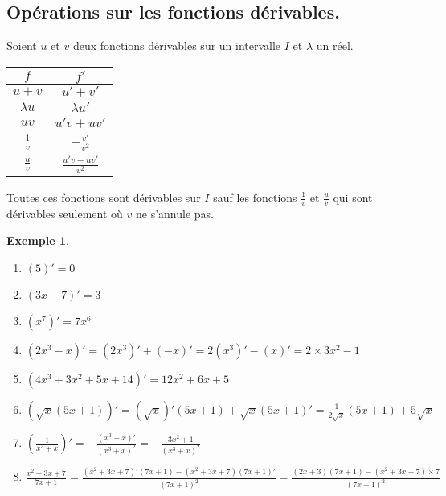 \documentclass[a4paper,11pt]{article}
\theoremstyle{break}
\newcounter{enonce}
\newtheorem{exemple}[enonce]{Exemple}
\begin{document}
    \subsection{Opérations sur les fonctions dérivables.}
  
  \begin{proposition}
  Soient $u$ et $v$ deux fonctions dérivables sur un intervalle $I$ et $\lambda$ un réel. 
  
  \begin{center}
    \begin{tabular}{|c|c|} \hline
   $f$ & $f'$ \\ \hline
   $u+v$ & $u'+v'$ \\ \hline
   $\lambda u$ & $\lambda u'$ \\ \hline
   $uv$ & $u'v+uv'$ \\ \hline
   $\frac{1}{v}$&$-\frac{v'}{v^2}$ \\ \hline
   $\frac{u}{v}$&$\frac{u'v-uv'}{v^2}$ \\ \hline
  \end{tabular}
  \end{center}
  Toutes ces fonctions sont dérivables sur $I$ sauf les fonctions $\frac{1}{v}$ et $\frac{u}{v}$ 
  qui sont dérivables seulement où $v$ ne s'annule pas. 
   
  \end{proposition}
 
 \begin{exemple}
  \begin{enumerate}
  \item $(5)'=0$
  \item $(3x-7)'=3$
  \item $(x^7)'=7x^6$
  \item $(2x^3-x)'=(2x^3)'+(-x)'=2(x^3)'-(x)'=2 \times 3 x^2-1$
  \item $(4x^3+3x^2+5x+14)'=12x^2+6x+5$
  \item $(\sqrt{x}(5x+1))'=(\sqrt{x})'(5x+1)+\sqrt{x}(5x+1)'=\frac{1}{2\sqrt{x}}(5x+1)+5\sqrt{x}$
  \item $(\frac{1}{x^3+x})'=-\frac{(x^3+x)'}{(x^3+x)^2}=-\frac{3x^2+1}{(x^3+x)^2}$
  \item $\frac{x^2+3x+7}{7x+1}=\frac{(x^2+3x+7)'(7x+1)-(x^2+3x+7)(7x+1)'}{(7x+1)^2}=
  \frac{(2x+3)(7x+1)-(x^2+3x+7)\times 7}{(7x+1)^2}$
  \end{enumerate}

\end{exemple}

\newpage
\end{document}
